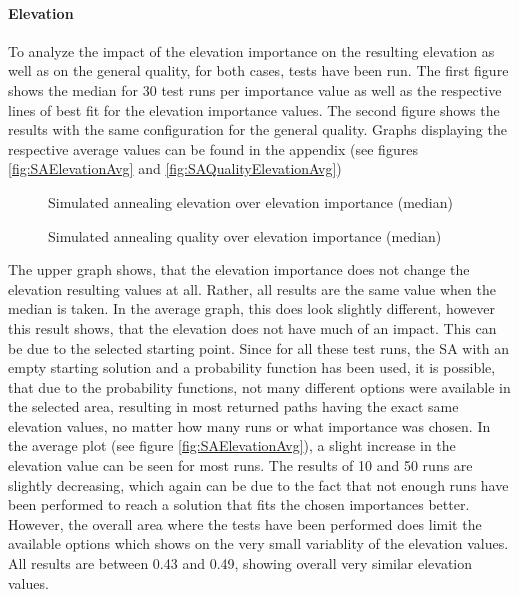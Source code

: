 \paragraph{Elevation}

To analyze the impact of the elevation importance on the resulting elevation as well as on the general quality, for both cases, tests have been run.
The first figure shows the median for 30 test runs per importance value as well as the respective lines of best fit for the elevation importance values.
The second figure shows the results with the same configuration for the general quality.
Graphs displaying the respective average values can be found in the appendix (see figures \ref{fig:SAElevationAvg} and \ref{fig:SAQualityElevationAvg})



\begin{figure}[H]
	\centering
	
	\caption{Simulated annealing elevation over elevation importance (median)}
	\label{fig:SAElevationMed}
\end{figure}



\begin{figure}[H]
	\centering
	
	\caption{Simulated annealing quality over elevation importance (median)}
	\label{fig:SAQualityElevationMed}
\end{figure}

The upper graph shows, that the elevation importance does not change the elevation resulting values at all.
Rather, all results are the same value when the median is taken. 
In the average graph, this does look slightly different, however this result shows, that the elevation does not have much of an impact.
This can be due to the selected starting point.
Since for all these test runs, the SA with an empty starting solution and a probability function has been used, it is possible, that due to the probability functions, not many different options were available in the selected area, resulting in most returned paths having the exact same elevation values, no matter how many runs or what importance was chosen.
In the average plot (see figure \ref{fig:SAElevationAvg}), a slight increase in the elevation value can be seen for most runs.
The results of 10 and 50 runs are slightly decreasing, which again can be due to the fact that not enough runs have been performed to reach a solution that fits the chosen importances better.
However, the overall area where the tests have been performed does limit the available options which shows on the very small variablity of the elevation values.
All results are between 0.43 and 0.49, showing overall very similar elevation values.


